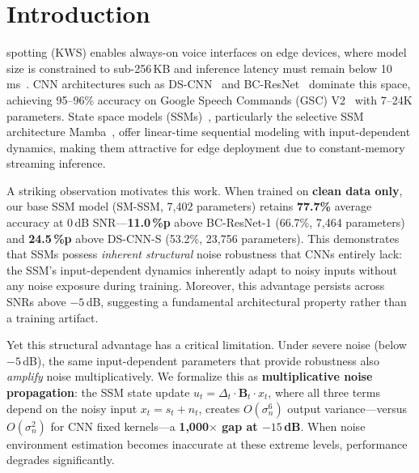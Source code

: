 \documentclass[journal]{IEEEtran}
\begin{document}
\section{Introduction}
\label{sec:intro}

 spotting (KWS) enables always-on voice interfaces on edge devices, where model size is constrained to sub-256\,KB and inference latency must remain below 10\,ms~\cite{banbury2021mlperf,lin2020mcunet}.
CNN architectures such as DS-CNN~\cite{zhang2017hello} and BC-ResNet~\cite{kim2021bcresnet} dominate this space, achieving 95--96\% accuracy on Google Speech Commands (GSC) V2~\cite{warden2018speech} with 7--24K parameters.
State space models (SSMs)~\cite{gu2024mamba,gu2022efficiently}, particularly the selective SSM architecture Mamba~\cite{gu2024mamba}, offer linear-time sequential modeling with input-dependent dynamics, making them attractive for edge deployment due to constant-memory streaming inference.

A striking observation motivates this work.
When trained on \textbf{clean data only}, our base SSM model (SM-SSM, 7{,}402 parameters) retains \textbf{77.7\%} average accuracy at 0\,dB SNR---\textbf{11.0\,\%p} above BC-ResNet-1 (66.7\%, 7{,}464 parameters) and \textbf{24.5\,\%p} above DS-CNN-S (53.2\%, 23{,}756 parameters).
This demonstrates that SSMs possess \emph{inherent structural} noise robustness that CNNs entirely lack: the SSM's input-dependent dynamics inherently adapt to noisy inputs without any noise exposure during training.
Moreover, this advantage persists across SNRs above $-5$\,dB, suggesting a fundamental architectural property rather than a training artifact.

Yet this structural advantage has a critical limitation.
Under severe noise (below $-5$\,dB), the same input-dependent parameters that provide robustness also \emph{amplify} noise multiplicatively.
We formalize this as \textbf{multiplicative noise propagation}: the SSM state update $u_t = \Delta_t \cdot \mathbf{B}_t \cdot x_t$, where all three terms depend on the noisy input $x_t = s_t + n_t$, creates $O(\sigma_n^6)$ output variance---versus $O(\sigma_n^2)$ for CNN fixed kernels---a \textbf{1{,}000$\times$ gap at $-15$\,dB}.
When noise environment estimation becomes inaccurate at these extreme levels, performance degrades significantly.
\end{document}
